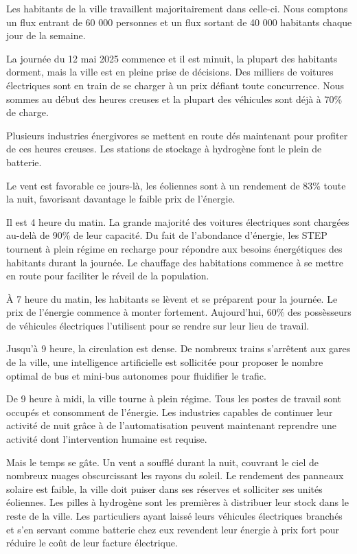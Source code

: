 Les habitants de la ville travaillent majoritairement dans celle-ci.
Nous comptons un flux entrant de 60 000 personnes et un flux sortant de 40 000 habitants chaque jour
de la semaine.

La journée du 12 mai 2025 commence et il est minuit, la plupart des habitants dorment, mais
la ville est en pleine prise de décisions.
Des milliers de voitures électriques sont en train de se charger à un prix défiant toute concurrence.
Nous sommes au début des heures creuses et la plupart des véhicules sont déjà à 70\% de charge.

Plusieurs industries énergivores se mettent en route dés maintenant pour profiter de ces heures creuses.
Les stations de stockage à hydrogène font le plein de batterie.

Le vent est favorable ce jours-là, les éoliennes sont à un rendement de 83\% toute la nuit,
favorisant davantage le faible prix de l'énergie.

Il est 4 heure du matin. La grande majorité des voitures électriques sont chargées au-delà de 90\% de leur capacité.
Du fait de l'abondance d'énergie, les STEP tournent à plein régime en recharge pour répondre aux besoins
énergétiques des habitants durant la journée.
Le chauffage des habitations commence à se mettre en route pour faciliter le réveil de la population.

À 7 heure du matin, les habitants se lèvent et se préparent pour la journée. Le prix de l'énergie commence à monter
fortement. Aujourd'hui, 60\% des possèsseurs de véhicules électriques l'utilisent pour se rendre sur leur lieu de travail.

Jusqu'à 9 heure, la circulation est dense. De nombreux trains s'arrêtent aux gares de la ville,
une intelligence artificielle est sollicitée pour proposer le nombre optimal
de bus et mini-bus autonomes pour fluidifier le trafic.

De 9 heure à midi, la ville tourne à plein régime. Tous les postes de travail sont occupés et consomment de l'énergie.
Les industries capables de continuer leur activité de nuit grâce à de l'automatisation peuvent maintenant
reprendre une activité dont l'intervention humaine est requise.

Mais le temps se gâte. Un vent a soufflé durant la nuit, couvrant le ciel de nombreux nuages obscurcissant
les rayons du soleil. Le rendement des panneaux solaire est faible, la ville doit puiser dans
ses réserves et solliciter ses unités éoliennes.
Les pilles à hydrogène sont les premières à distribuer leur stock dans le reste de la ville.
Les particuliers ayant laissé leurs véhicules électriques branchés et s'en servant comme batterie chez eux revendent
leur énergie à prix fort pour réduire le coût de leur facture électrique.

